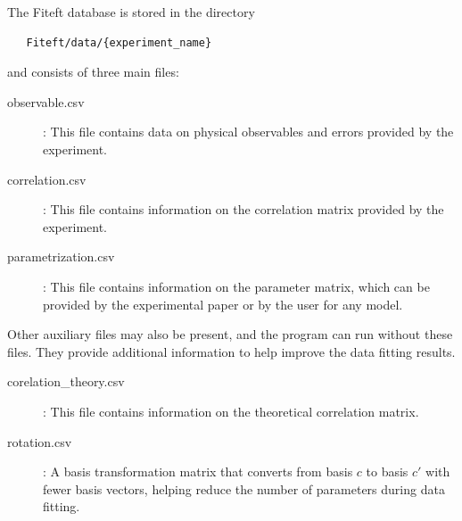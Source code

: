 \documentclass[12pt]{article}
\begin{document}
 The Fiteft database is stored in the directory
 \begin{verbatim}
   Fiteft/data/{experiment_name}
 \end{verbatim}
 and consists of three main files:
 \begin{description}
   \item[observable.csv]: This file contains data on physical observables and errors provided by the experiment.
   \item[correlation.csv]: This file contains information on the correlation matrix provided by the experiment.
   \item[parametrization.csv]: This file contains information on the parameter matrix, which can be provided by the experimental paper or by the user for any model.
 \end{description}
 Other auxiliary files may also be present, and the program can run without these files. They provide additional information to help improve the data fitting results.
 \begin{description} 
   \item [corelation\_theory.csv]: This file contains information on the theoretical correlation matrix.
   \item [rotation.csv]: A basis transformation matrix that converts from basis $c$ to basis $c'$ with fewer basis vectors, helping reduce the number of parameters during data fitting.
 \end{description}
\end{document}
